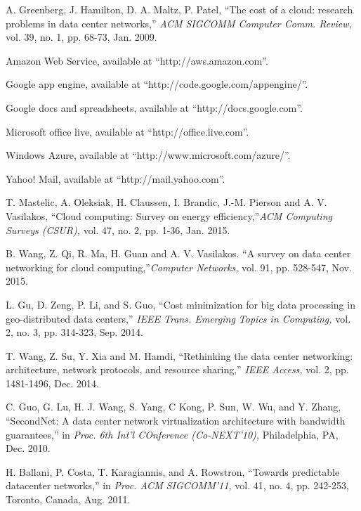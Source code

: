 \documentclass[twocolumn,10pt]{IEEEtran}
\begin{document}
\begin{thebibliography}{1}
A. Greenberg, J. Hamilton, D. A. Maltz, P. Patel, ``The cost of a cloud: research problems in data center networks,'' {\em \it ACM SIGCOMM Computer Comm. Review,} vol. 39, no. 1, pp. 68-73, Jan. 2009.


Amazon Web Service, available at ``http://aws.amazon.com''.

Google app engine, available at ``http://code.google.com/appengine/''.

Google docs and spreadsheets, available at ``http://docs.google.com''.

Microsoft office live, available at ``http://office.live.com''.

Windows Azure, available at ``http://www.microsoft.com/azure/''.

Yahoo! Mail, available at ``http://mail.yahoo.com''.

T. Mastelic, A. Oleksiak, H. Claussen, I. Brandic, J.-M. Pierson and A. V. Vasilakos, ``Cloud computing: Survey on energy efficiency,''{\em \it ACM Computing Surveys (CSUR),} vol. 47, no. 2, pp. 1-36, Jan. 2015.

B. Wang, Z. Qi, R. Ma, H. Guan and A. V. Vasilakos. ``A survey on data center networking for cloud computing,''{\em \it Computer Networks,} vol. 91, pp. 528-547, Nov. 2015.

L. Gu, D. Zeng, P. Li, and S. Guo, ``Cost minimization for big data processing in geo-distributed data centers,'' {\em \it IEEE Trans. Emerging Topics in Computing,} vol. 2, no. 3, pp. 314-323, Sep. 2014.

T. Wang, Z. Su, Y. Xia and M. Hamdi, ``Rethinking the data center networking: architecture, network protocols, and resource sharing,'' {\em \it IEEE Access,} vol. 2, pp. 1481-1496, Dec. 2014.

C. Guo, G. Lu, H. J. Wang, S. Yang, C Kong, P. Sun, W. Wu, and Y. Zhang, ``SecondNet: A data center network virtualization architecture with bandwidth guarantees,'' in {\em \it Proc. 6th Int'l COnference (Co-NEXT'10),} Philadelphia, PA, Dec. 2010.

H. Ballani, P. Costa, T. Karagiannis, and A. Rowstron, ``Towards predictable datacenter networks,'' in {\em \it Proc. ACM SIGCOMM'11,} vol. 41, no. 4, pp. 242-253, Toronto, Canada, Aug. 2011.



\end{thebibliography}
\end{document}
